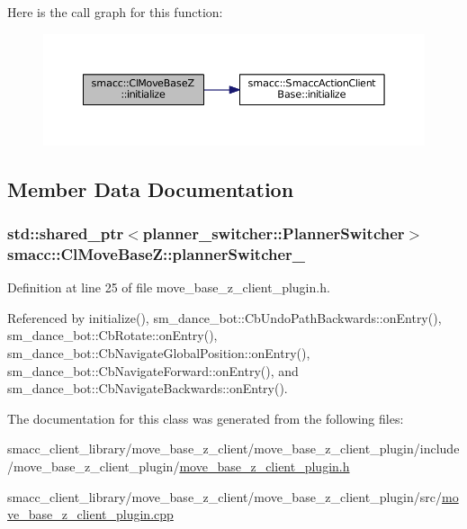 Here is the call graph for this function\+:
\nopagebreak
\begin{figure}[H]
\begin{center}
\leavevmode
\includegraphics[width=350pt]{classsmacc_1_1ClMoveBaseZ_a0eb8e4a0e80456fa534bbef7b2e330a5_cgraph}
\end{center}
\end{figure}




\subsection{Member Data Documentation}
\subsubsection[{\texorpdfstring{planner\+Switcher\+\_\+}{plannerSwitcher_}}]{\setlength{\rightskip}{0pt plus 5cm}std\+::shared\+\_\+ptr$<${\bf planner\+\_\+switcher\+::\+Planner\+Switcher}$>$ smacc\+::\+Cl\+Move\+Base\+Z\+::planner\+Switcher\+\_\+}\hypertarget{classsmacc_1_1ClMoveBaseZ_a712e0df77c9629930e03cbb4c539b485}{}\label{classsmacc_1_1ClMoveBaseZ_a712e0df77c9629930e03cbb4c539b485}


Definition at line 25 of file move\+\_\+base\+\_\+z\+\_\+client\+\_\+plugin.\+h.



Referenced by initialize(), sm\+\_\+dance\+\_\+bot\+::\+Cb\+Undo\+Path\+Backwards\+::on\+Entry(), sm\+\_\+dance\+\_\+bot\+::\+Cb\+Rotate\+::on\+Entry(), sm\+\_\+dance\+\_\+bot\+::\+Cb\+Navigate\+Global\+Position\+::on\+Entry(), sm\+\_\+dance\+\_\+bot\+::\+Cb\+Navigate\+Forward\+::on\+Entry(), and sm\+\_\+dance\+\_\+bot\+::\+Cb\+Navigate\+Backwards\+::on\+Entry().



The documentation for this class was generated from the following files\+:\begin{DoxyCompactItemize}
\item 
smacc\+\_\+client\+\_\+library/move\+\_\+base\+\_\+z\+\_\+client/move\+\_\+base\+\_\+z\+\_\+client\+\_\+plugin/include/move\+\_\+base\+\_\+z\+\_\+client\+\_\+plugin/\hyperlink{move__base__z__client__plugin_8h}{move\+\_\+base\+\_\+z\+\_\+client\+\_\+plugin.\+h}\item 
smacc\+\_\+client\+\_\+library/move\+\_\+base\+\_\+z\+\_\+client/move\+\_\+base\+\_\+z\+\_\+client\+\_\+plugin/src/\hyperlink{move__base__z__client__plugin_8cpp}{move\+\_\+base\+\_\+z\+\_\+client\+\_\+plugin.\+cpp}\end{DoxyCompactItemize}
